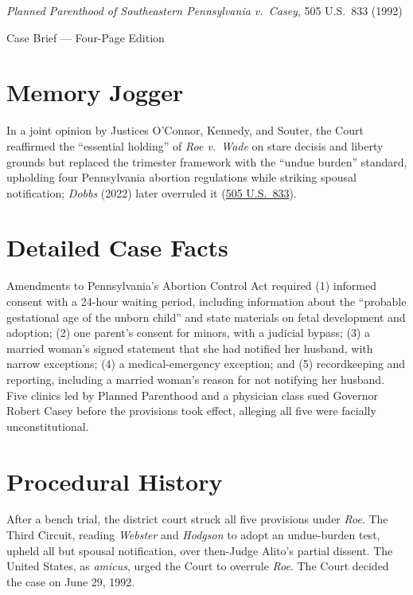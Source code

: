 \documentclass[12pt]{article}
\begin{document}
\begin{center}
{\LARGE \textit{Planned Parenthood of Southeastern Pennsylvania v.\ Casey}, 505 U.S.\ 833 (1992)\par}
\vspace{0.8em}
{\large Case Brief --- Four-Page Edition\par}
\end{center}
\vspace{1em}

\section{Memory Jogger}

In a joint opinion by Justices O'Connor, Kennedy, and Souter, the Court reaffirmed the ``essential holding'' of \textit{Roe v.\ Wade} on stare decisis and liberty grounds but replaced the trimester framework with the ``undue burden'' standard, upholding four Pennsylvania abortion regulations while striking spousal notification; \textit{Dobbs} (2022) later overruled it (\href{https://supreme.justia.com/cases/federal/us/505/833/}{505 U.S.\ 833}).

\section{Detailed Case Facts}

Amendments to Pennsylvania's Abortion Control Act required (1) informed consent with a 24-hour waiting period, including information about the ``probable gestational age of the unborn child'' and state materials on fetal development and adoption; (2) one parent's consent for minors, with a judicial bypass; (3) a married woman's signed statement that she had notified her husband, with narrow exceptions; (4) a medical-emergency exception; and (5) recordkeeping and reporting, including a married woman's reason for not notifying her husband. Five clinics led by Planned Parenthood and a physician class sued Governor Robert Casey before the provisions took effect, alleging all five were facially unconstitutional.

\section{Procedural History}

After a bench trial, the district court struck all five provisions under \textit{Roe}. The Third Circuit, reading \textit{Webster} and \textit{Hodgson} to adopt an undue-burden test, upheld all but spousal notification, over then-Judge Alito's partial dissent. The United States, as \textit{amicus}, urged the Court to overrule \textit{Roe}. The Court decided the case on June 29, 1992.
\end{document}
